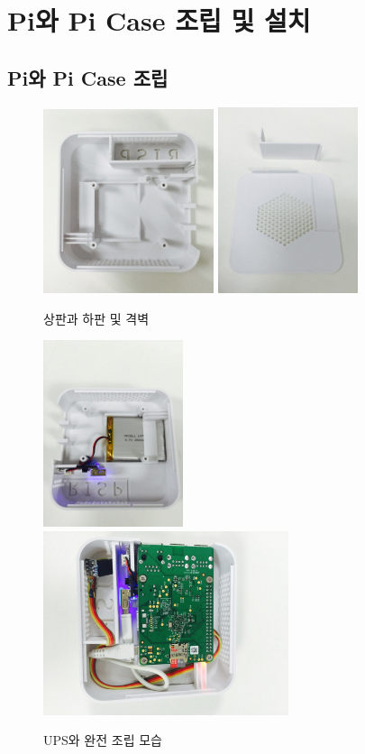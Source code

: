 \documentclass[11pt
  , a4paper
  , article
  , oneside
]{memoir}
\begin{document}
\chapter{Pi와 Pi Case 조립 및 설치}
\section{Pi와 Pi Case 조립}
\begin{center}
	\begin{figure}[h]
		\includegraphics[width=5cm]{./images/a.jpg}
		\includegraphics[width=4.1cm]{./images/b.jpg}
		\caption{상판과 하판 및 격벽}
	\end{figure}
\end{center}
\begin{center}
	\begin{figure}[h]
		\includegraphics[width=4.1cm]{./images/c.jpg}
		\includegraphics[width=7.2cm]{./images/f.jpg}
		\caption{UPS와 완전 조립 모습}
	\end{figure}
\end{center}
\end{document}
